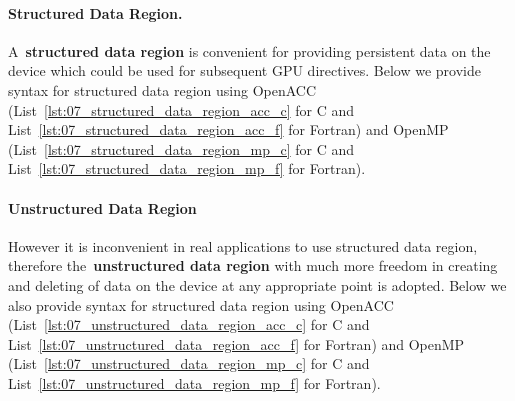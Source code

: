 \paragraph{Structured Data Region.}
A~\textbf{structured data region} is convenient for providing persistent data on the device which could be used for subsequent GPU directives.
Below we provide syntax for structured data region using OpenACC (List~\ref{lst:07_structured_data_region_acc_c} for C and List~\ref{lst:07_structured_data_region_acc_f} for Fortran) and OpenMP (List~\ref{lst:07_structured_data_region_mp_c} for C and List~\ref{lst:07_structured_data_region_mp_f} for Fortran).














\paragraph{Unstructured Data Region}
However it is inconvenient in real applications to use structured data region, therefore the~\textbf{unstructured data region} with much more freedom in creating and deleting of data on the device at any appropriate point is adopted.
Below we also provide syntax for structured data region using OpenACC (List~\ref{lst:07_unstructured_data_region_acc_c} for C and List~\ref{lst:07_unstructured_data_region_acc_f} for Fortran) and OpenMP (List~\ref{lst:07_unstructured_data_region_mp_c} for C and List~\ref{lst:07_unstructured_data_region_mp_f} for Fortran).


